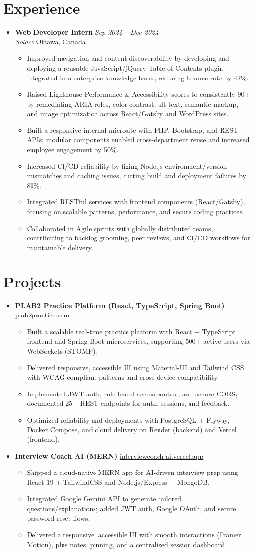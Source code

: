 \documentclass[letterpaper,10pt]{article}
\newcommand{\resumeItem}[1]{\item #1}
\newcommand{\resumeSubheading}[4]{%
  \item
  \textbf{#1} \hfill \textit{#2}\\
  \textit{#3} \hfill {#4}
}
\newcommand{\resumeProjectHeading}[3]{%
  \item
  \textbf{#1} \hfill \href{#2}{#3}
}
\newcommand{\resumeSubHeadingListStart}{\begin{itemize}[leftmargin=0in,label={}]}
\newcommand{\resumeSubHeadingListEnd}{\end{itemize}}
\newcommand{\resumeItemListStart}{\begin{itemize}}
\newcommand{\resumeItemListEnd}{\end{itemize}}
\begin{document}
\section{Experience}
\resumeSubHeadingListStart
  \resumeSubheading
    {Web Developer Intern}{Sep 2024 -- Dec 2024}
    {Solace}{Ottawa, Canada}
  \resumeItemListStart
    \resumeItem{Improved navigation and content discoverability by developing and deploying a reusable JavaScript/jQuery Table of Contents plugin integrated into enterprise knowledge bases, reducing bounce rate by 42\%.}
    \resumeItem{Raised Lighthouse Performance \& Accessibility scores to consistently 90+ by remediating ARIA roles, color contrast, alt text, semantic markup, and image optimization across React/Gatsby and WordPress sites.}
    \resumeItem{Built a responsive internal microsite with PHP, Bootstrap, and REST APIs; modular components enabled cross-department reuse and increased employee engagement by 50\%.}
    \resumeItem{Increased CI/CD reliability by fixing Node.js environment/version mismatches and caching issues, cutting build and deployment failures by 80\%.}
    \resumeItem{Integrated RESTful services with frontend components (React/Gatsby), focusing on scalable patterns, performance, and secure coding practices.}
    \resumeItem{Collaborated in Agile sprints with globally distributed teams, contributing to backlog grooming, peer reviews, and CI/CD workflows for maintainable delivery.}
  \resumeItemListEnd
\resumeSubHeadingListEnd

\section{Projects}
\resumeSubHeadingListStart
  \resumeProjectHeading{PLAB2 Practice Platform (React, TypeScript, Spring Boot)}{https://plab2practice.com}{plab2practice.com}
  \resumeItemListStart
    \resumeItem{Built a scalable real-time practice platform with React + TypeScript frontend and Spring Boot microservices, supporting 500+ active users via WebSockets (STOMP).}
    \resumeItem{Delivered responsive, accessible UI using Material-UI and Tailwind CSS with WCAG-compliant patterns and cross-device compatibility.}
    \resumeItem{Implemented JWT auth, role-based access control, and secure CORS; documented 25+ REST endpoints for auth, sessions, and feedback.}
    \resumeItem{Optimized reliability and deployments with PostgreSQL + Flyway, Docker Compose, and cloud delivery on Render (backend) and Vercel (frontend).}
  \resumeItemListEnd

  \resumeProjectHeading{Interview Coach AI (MERN)}{https://interviewcoach-ai.vercel.app/}{interviewcoach-ai.vercel.app}
  \resumeItemListStart
    \resumeItem{Shipped a cloud-native MERN app for AI-driven interview prep using React 19 + TailwindCSS and Node.js/Express + MongoDB.}
    \resumeItem{Integrated Google Gemini API to generate tailored questions/explanations; added JWT auth, Google OAuth, and secure password reset flows.}
    \resumeItem{Delivered a responsive, accessible UI with smooth interactions (Framer Motion), plus notes, pinning, and a centralized session dashboard.}
  \resumeItemListEnd
\resumeSubHeadingListEnd
\end{document}
